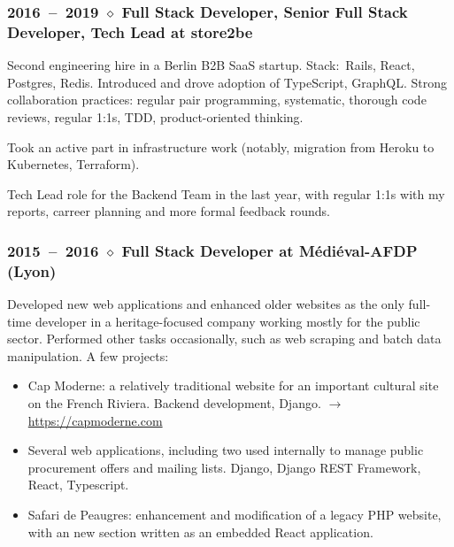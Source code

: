 \documentclass[10pt]{article}
\begin{document}
\begin{minipage}[t]{0.54\textwidth}
    \subsubsection*{2016~--~2019 $\diamond$ Full Stack Developer, Senior Full Stack Developer, Tech Lead at store2be}

    \vspace{-0.8em}

    Second engineering hire in a Berlin B2B SaaS startup. Stack:~Rails, React,
    Postgres, Redis. Introduced and drove adoption of
    TypeScript, GraphQL. Strong collaboration practices: regular pair programming, systematic, thorough code reviews, regular 1:1s, TDD, product-oriented thinking.

    Took an active part in infrastructure work (notably, migration from Heroku
    to Kubernetes, Terraform).

    Tech Lead role for the Backend Team in the last year, with regular 1:1s with
    my reports, carreer planning and more formal feedback rounds.

    \vspace{-0.5em}

    \subsubsection*{2015~--~2016 $\diamond$ Full Stack Developer at Médiéval-AFDP (Lyon)}

    \vspace{-0.8em}

    Developed new web applications and enhanced older websites as the only
    full-time developer in a heritage-focused company working mostly for
    the public sector. Performed other tasks occasionally, such as web
    scraping and batch data manipulation. A few projects:
    \begin{itemize}
    \item
      Cap Moderne: a relatively traditional website for an important cultural site
      on the French Riviera. Backend development, Django. $\rightarrow$ \url{https://capmoderne.com}
    \item
      Several web applications, including two used internally to manage public
      procurement offers and mailing lists. Django, Django REST Framework,
      React, Typescript.
    \item
      Safari de Peaugres: enhancement and modification of a legacy PHP website,
      with an new section written as an embedded React application.
    \end{itemize}

\end{minipage}
\end{document}
